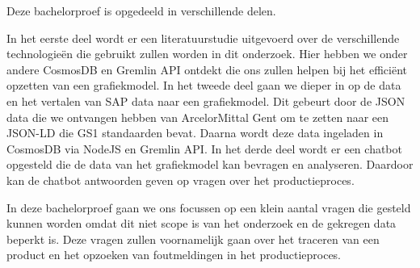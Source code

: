 Deze bachelorproef is opgedeeld in verschillende delen.

In het eerste deel wordt er een literatuurstudie uitgevoerd over de verschillende technologieën die gebruikt zullen worden in dit onderzoek.
Hier hebben we onder andere CosmosDB en Gremlin API ontdekt die ons zullen helpen bij het efficiënt opzetten van een grafiekmodel.
In het tweede deel gaan we dieper in op de data en het vertalen van SAP data naar een grafiekmodel.
Dit gebeurt door de JSON data die we ontvangen hebben van ArcelorMittal Gent om te zetten naar een JSON-LD die GS1 standaarden bevat.
Daarna wordt deze data ingeladen in CosmosDB via NodeJS en Gremlin API.\@
In het derde deel wordt er een chatbot opgesteld die de data van het grafiekmodel kan bevragen en analyseren. 
Daardoor kan de chatbot antwoorden geven op vragen over het productieproces.

In deze bachelorproef gaan we ons focussen op een klein aantal vragen die gesteld kunnen worden omdat dit niet scope is van het onderzoek en de gekregen data beperkt is.
Deze vragen zullen voornamelijk gaan over het traceren van een product en het opzoeken van foutmeldingen in het productieproces.